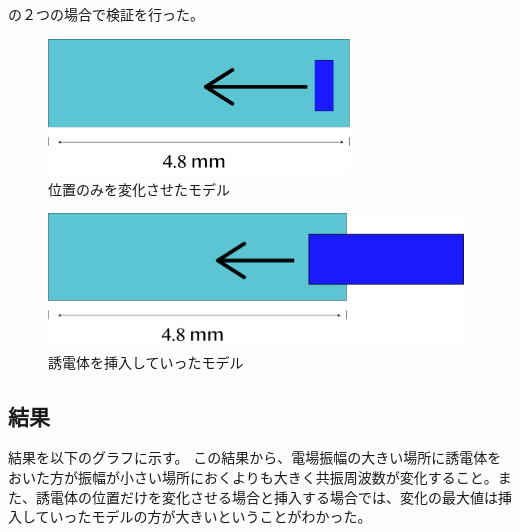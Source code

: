 の２つの場合で検証を行った。

\vspace{10 mm}

\begin{figure}[h]
  \begin{center}
    \includegraphics[width=8cm]{./image/pos.png}
    \caption{位置のみを変化させたモデル}
    \label{fig:potition}
  \end{center}
\end{figure}

\vspace{10 mm}

\begin{figure}[h]
  \begin{center}
    \includegraphics[width=11cm]{./image/length.png}
    \caption{誘電体を挿入していったモデル}
    \label{fig:length}
  \end{center}
\end{figure}

\subsection{結果}
結果を以下のグラフに示す。
この結果から、電場振幅の大きい場所に誘電体をおいた方が振幅が小さい場所におくよりも大きく共振周波数が変化すること。また、誘電体の位置だけを変化させる場合と挿入する場合では、変化の最大値は挿入していったモデルの方が大きいということがわかった。


\vspace{10 mm}


